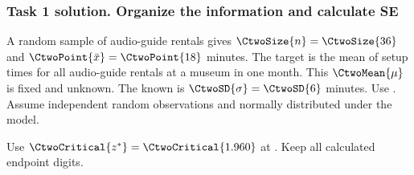 \subsubsection*{Task 1 solution. Organize the information and calculate SE}
\label{sol:c2-advanced-a-a}
A random sample of  audio-guide rentals gives $\CtwoSize{n}=\CtwoSize{36}$ and  $\CtwoPoint{\bar{x}}=\CtwoPoint{18}$ minutes. The target is the mean of setup times for all audio-guide rentals at a museum in one month. This  $\CtwoMean{\mu}$ is fixed and unknown. The known  is $\CtwoSD{\sigma}=\CtwoSD{6}$ minutes. Use  . Assume independent random observations and normally distributed  under the model.

Use $\CtwoCritical{z^*}=\CtwoCritical{1.960}$ at . Keep all calculated endpoint digits.

